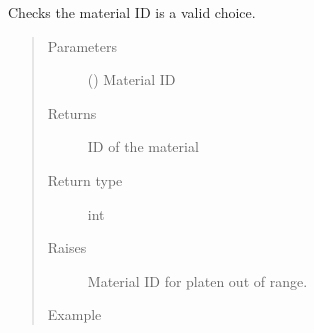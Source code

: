 \documentclass[letterpaper,10pt,english]{sphinxmanual}
\begin{document}
\begin{fulllineitems}
\begin{fulllineitems}
\begin{quote}
\begin{description}
\end{description}\end{quote}

\end{fulllineitems}


\begin{fulllineitems}
\label{\detokenize{openfdem:openfdem.openfdem.Model.mat_bound_check}}
Checks the material ID is a valid choice.
\begin{quote}\begin{description}
\item[{Parameters}] \leavevmode
{} () \textendash{} Material ID

\item[{Returns}] \leavevmode
ID of the material

\item[{Return type}] \leavevmode
int

\item[{Raises}] \leavevmode
{} \textendash{} Material ID for platen out of range.

\item[{Example}] \leavevmode
\begin{sphinxVerbatim}[commandchars=\\\{\}]
   
  
\end{sphinxVerbatim}

\end{description}\end{quote}


\end{fulllineitems}
\end{fulllineitems}
\end{document}
